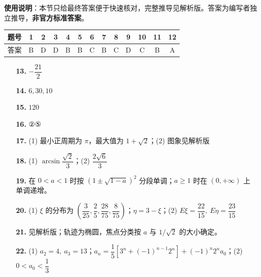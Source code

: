 
\begin{gknotice}
\textbf{使用说明}：本节只给最终答案便于快速核对，完整推导见解析版。答案为编写者独立推导，\textbf{非官方标准答案}。
\end{gknotice}

\begin{center}\begin{tabular}{ccccccccccccc}
\toprule
题号 & 1 & 2 & 3 & 4 & 5 & 6 & 7 & 8 & 9 & 10 & 11 & 12 \\
\midrule
答案 & B & D & D & B & B & C & B & C & D & C & B & A \\
\bottomrule
\end{tabular}\end{center}

\begin{itemize}[leftmargin=2.6em]
  \item[\textbf{13.}] $-\dfrac{21}{2}$
  \item[\textbf{14.}] $6,30,10$
  \item[\textbf{15.}] $120$
  \item[\textbf{16.}] ②⑤
\end{itemize}

\begin{itemize}[leftmargin=2.6em]
  \item[\textbf{17.}] (1) 最小正周期为 $\pi$，最大值为 $1+\sqrt2$；(2) 图象见解析版
  \item[\textbf{18.}] (1) $\arcsin\dfrac{\sqrt2}{3}$；(2) $\dfrac{2\sqrt6}{3}$
  \item[\textbf{19.}] 在 $0<a<1$ 时按 $(1\pm\sqrt{1-a})^2$ 分段单调；$a\geqslant1$ 时在 $(0,+\infty)$ 上单调递增。
  \item[\textbf{20.}] (1) $\xi$ 的分布为 $\left(\dfrac3{25},\dfrac25,\dfrac{28}{75},\dfrac8{75}\right)$；$\eta=3-\xi$；(2) $E\xi=\dfrac{22}{15},\ E\eta=\dfrac{23}{15}$
  \item[\textbf{21.}] 见解析版；轨迹为椭圆，焦点分类按 $a$ 与 $1/\sqrt2$ 的大小确定。
  \item[\textbf{22.}] (1) $a_2=4,\ a_3=13$；$a_n=\dfrac15[3^n+(-1)^{n-1}2^n]+(-1)^n2^na_0$；(2) $0<a_0<\dfrac13$
\end{itemize}
